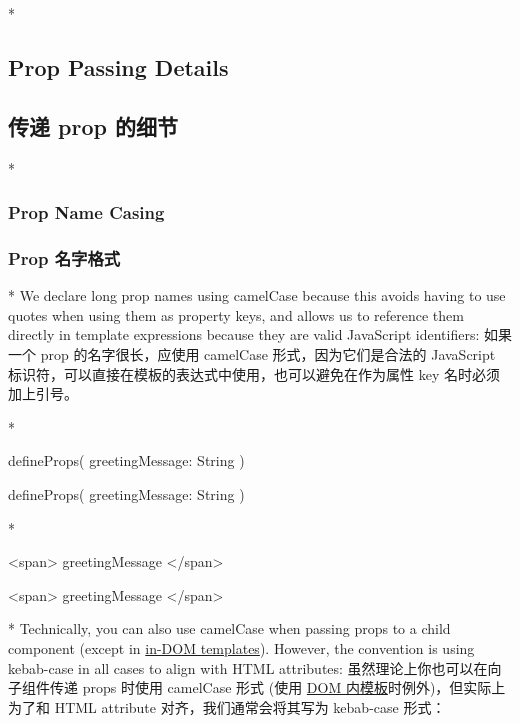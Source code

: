 \begin{paracol}{2}

\switchcolumn[0]*%
\subsection{Prop Passing Details}
\switchcolumn
\subsection{传递 prop 的细节}
\switchcolumn[0]*%
\subsubsection{Prop Name Casing}
\switchcolumn
\subsubsection{Prop 名字格式}
\switchcolumn[0]*%
We declare long prop names using camelCase because this avoids having to
use quotes when using them as property keys, and allows us to reference
them directly in template expressions because they are valid JavaScript
identifiers:
\switchcolumn
如果一个 prop 的名字很长，应使用 camelCase 形式，因为它们是合法的
JavaScript 标识符，可以直接在模板的表达式中使用，也可以避免在作为属性
key 名时必须加上引号。

\switchcolumn[0]*%
\begin{codeJs}
defineProps({
  greetingMessage: String
})
\end{codeJs}
\switchcolumn
\begin{codeJs}
defineProps({
  greetingMessage: String
})
\end{codeJs}
\switchcolumn[0]*%
\begin{codeHtml}
<span>{{ greetingMessage }}</span>
\end{codeHtml}
\switchcolumn
\begin{codeHtml}
<span>{{ greetingMessage }}</span>
\end{codeHtml}
\switchcolumn[0]*%
Technically, you can also use camelCase when passing props to a child
component (except in
\href{https://vuejs.org/guide/essentials/component-basics.html\#in-dom-template-parsing-caveats}{in-DOM
templates}). However, the convention is using kebab-case in all cases to
align with HTML attributes:
\switchcolumn
虽然理论上你也可以在向子组件传递 props 时使用 camelCase 形式 (使用
\href{https://cn.vuejs.org/guide/essentials/component-basics.html\#in-dom-template-parsing-caveats}{DOM
内模板}时例外)，但实际上为了和 HTML attribute 对齐，我们通常会将其写为
kebab-case 形式：


\end{paracol}
